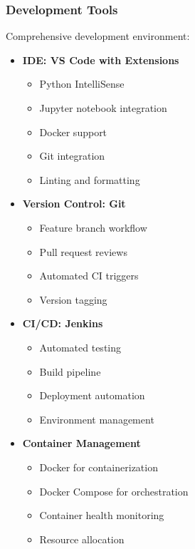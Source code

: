 \documentclass[12pt,a4paper]{report}
\begin{document}
\subsubsection{Development Tools}
Comprehensive development environment:

\begin{itemize}
    \item \textbf{IDE: VS Code with Extensions}
    \begin{itemize}
        \item Python IntelliSense
        \item Jupyter notebook integration
        \item Docker support
        \item Git integration
        \item Linting and formatting
    \end{itemize}
    
    \item \textbf{Version Control: Git}
    \begin{itemize}
        \item Feature branch workflow
        \item Pull request reviews
        \item Automated CI triggers
        \item Version tagging
    \end{itemize}
    
    \item \textbf{CI/CD: Jenkins}
    \begin{itemize}
        \item Automated testing
        \item Build pipeline
        \item Deployment automation
        \item Environment management
    \end{itemize}
    
    \item \textbf{Container Management}
    \begin{itemize}
        \item Docker for containerization
        \item Docker Compose for orchestration
        \item Container health monitoring
        \item Resource allocation
    \end{itemize}
\end{itemize}
\end{document}
